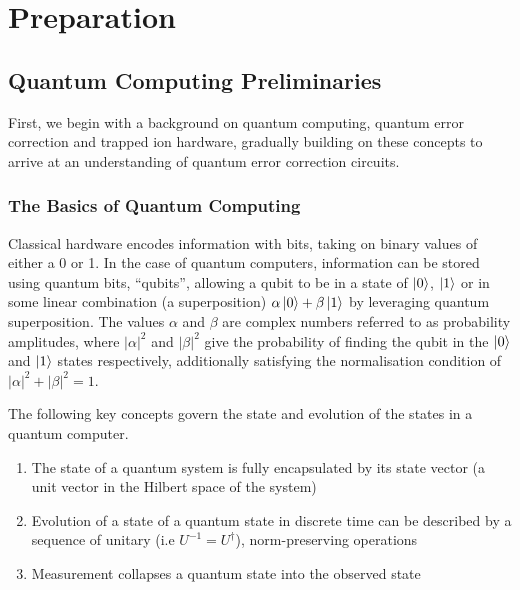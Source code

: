 \chapter{Preparation}

\section{Quantum Computing Preliminaries}
First, we begin with a background on quantum computing, quantum error correction and trapped ion hardware, gradually building on these concepts to arrive at an understanding of quantum error correction circuits.

\subsection*{The Basics of Quantum Computing}



Classical hardware encodes information with bits, taking on binary values of either a 0 or 1. In the case of quantum computers, information can be stored using quantum bits, ``qubits'', allowing a qubit to be in a state of $\ket{0}$, $\ket{1}$ or in some linear combination (a superposition) $\alpha\ket{0} + \beta\ket{1}$ by leveraging quantum superposition. The values $\alpha$ and $\beta$ are complex numbers referred to as probability amplitudes, where $\lvert\alpha\rvert^2$ and $\lvert\beta\rvert^2$ give the probability of finding the qubit in the $\ket{0}$ and $\ket{1}$ states respectively, additionally satisfying the normalisation condition of $\lvert\alpha\rvert^2 + \lvert\beta\rvert^2 = 1$.


The following key concepts govern the state and evolution of the states in a quantum computer.

\begin{enumerate}
    \item The state of a quantum system is fully encapsulated by its state vector (a unit vector in the Hilbert space of the system)
    \item Evolution of a state of a quantum state in discrete time can be described by a sequence of unitary (i.e $U^{-1} = U^\dagger$), norm-preserving operations
    \item Measurement collapses a quantum state into the observed state
\end{enumerate}


